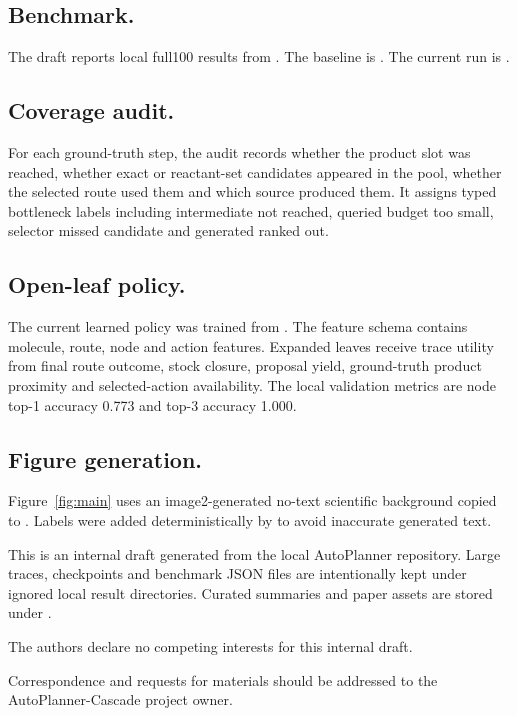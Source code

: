 \documentclass{nature}
\begin{document}
\begin{methods}
\subsection{Benchmark.}
The draft reports local full100 results from . The baseline is . The current run is .

\subsection{Coverage audit.}
For each ground-truth step, the audit records whether the product slot was reached, whether exact or reactant-set candidates appeared in the pool, whether the selected route used them and which source produced them. It assigns typed bottleneck labels including intermediate not reached, queried budget too small, selector missed candidate and generated ranked out.

\subsection{Open-leaf policy.}
The current learned policy was trained from . The feature schema contains molecule, route, node and action features. Expanded leaves receive trace utility from final route outcome, stock closure, proposal yield, ground-truth product proximity and selected-action availability. The local validation metrics are node top-1 accuracy 0.773 and top-3 accuracy 1.000.

\subsection{Figure generation.}
Figure~\ref{fig:main} uses an image2-generated no-text scientific background copied to . Labels were added deterministically by  to avoid inaccurate generated text.
\end{methods}

\begin{addendum}
\item[Data and code availability] This is an internal draft generated from the local AutoPlanner repository. Large traces, checkpoints and benchmark JSON files are intentionally kept under ignored local result directories. Curated summaries and paper assets are stored under .
\item[Competing interests] The authors declare no competing interests for this internal draft.
\item[Correspondence] Correspondence and requests for materials should be addressed to the AutoPlanner-Cascade project owner.
\end{addendum}
\end{document}
